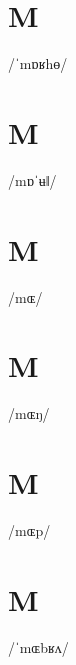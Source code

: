 \documentclass[10pt,a4paper,twoside]{book}
\begin{document}
\section*{M}

\begin{multicols}{3}
 {/ˈmɒʁhɵ/} {}
\end{multicols}

\section*{M}

\begin{multicols}{3}
 {/mɒˈʉǁ/} {}
\end{multicols}

\section*{M}

\begin{multicols}{3}
 {/mɶ/} {}
\end{multicols}

\section*{M}

\begin{multicols}{3}
 {/mɶŋ/} {}
\end{multicols}

\section*{M}

\begin{multicols}{3}
 {/mɶp/} {}
\end{multicols}

\section*{M}

\begin{multicols}{3}
 {/ˈmɶbʁʌ/} {}
\end{multicols}
\end{document}

